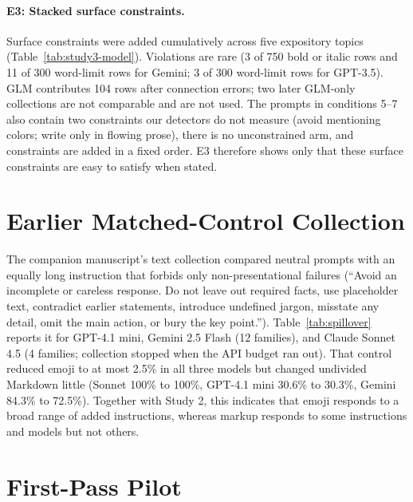 \documentclass[acmsmall,screen,review,anonymous]{acmart}
\begin{document}
\paragraph{E3: Stacked surface constraints.} Surface constraints were added cumulatively across five expository topics (Table~\ref{tab:study3-model}). Violations are rare (3 of 750 bold or italic rows and 11 of 300 word-limit rows for Gemini; 3 of 300 word-limit rows for GPT-3.5). GLM contributes 104 rows after connection errors; two later GLM-only collections are not comparable and are not used. The prompts in conditions 5--7 also contain two constraints our detectors do not measure (avoid mentioning colors; write only in flowing prose), there is no unconstrained arm, and constraints are added in a fixed order. E3 therefore shows only that these surface constraints are easy to satisfy when stated.



\section{Earlier Matched-Control Collection}
\label{app:phaseb}

The companion manuscript's text collection compared neutral prompts with an equally long instruction that forbids only non-presentational failures (``Avoid an incomplete or careless response. Do not leave out required facts, use placeholder text, contradict earlier statements, introduce undefined jargon, misstate any detail, omit the main action, or bury the key point.''). Table~\ref{tab:spillover} reports it for GPT-4.1 mini, Gemini 2.5 Flash (12 families), and Claude Sonnet 4.5 (4 families; collection stopped when the API budget ran out). That control reduced emoji to at most 2.5\% in all three models but changed undivided Markdown little (Sonnet 100\% to 100\%, GPT-4.1 mini 30.6\% to 30.3\%, Gemini 84.3\% to 72.5\%). Together with Study 2, this indicates that emoji responds to a broad range of added instructions, whereas markup responds to some instructions and models but not others.



\section{First-Pass Pilot}
\label{app:pilot}
\end{document}
